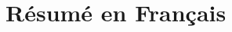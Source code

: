 \documentclass[a4paper,11pt,twoside]{ThesisStyle}
\begin{document}

\clearpage


\clearpage



%
%

\nocite{*}
\printnomenclature

\appendix



\part{R\'{e}sum\'{e} en Fran\c cais}
\end{document}
